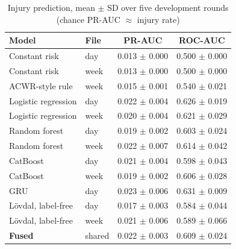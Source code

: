 \begin{table}[t]\centering\caption{Injury prediction, mean $\pm$ SD over five development rounds (chance PR-AUC $\approx$ injury rate)}\label{tab:injury}
\footnotesize\begin{tabular}{llcc}\toprule
Model & File & PR-AUC & ROC-AUC \\\midrule
Constant risk & day & 0.013 $\pm$ 0.000 & 0.500 $\pm$ 0.000 \\
Constant risk & week & 0.013 $\pm$ 0.000 & 0.500 $\pm$ 0.000 \\
ACWR-style rule & week & 0.015 $\pm$ 0.001 & 0.540 $\pm$ 0.021 \\
Logistic regression & day & 0.022 $\pm$ 0.004 & 0.626 $\pm$ 0.019 \\
Logistic regression & week & 0.020 $\pm$ 0.004 & 0.621 $\pm$ 0.029 \\
Random forest & day & 0.019 $\pm$ 0.002 & 0.603 $\pm$ 0.024 \\
Random forest & week & 0.022 $\pm$ 0.007 & 0.614 $\pm$ 0.042 \\
CatBoost & day & 0.021 $\pm$ 0.004 & 0.598 $\pm$ 0.043 \\
CatBoost & week & 0.019 $\pm$ 0.002 & 0.606 $\pm$ 0.028 \\
GRU & day & 0.023 $\pm$ 0.006 & 0.631 $\pm$ 0.009 \\
L\"ovdal, label-free & day & 0.017 $\pm$ 0.003 & 0.584 $\pm$ 0.044 \\
L\"ovdal, label-free & week & 0.021 $\pm$ 0.006 & 0.589 $\pm$ 0.066 \\
\textbf{Fused} & shared & 0.022 $\pm$ 0.003 & 0.609 $\pm$ 0.024 \\
\bottomrule\end{tabular}\end{table}
